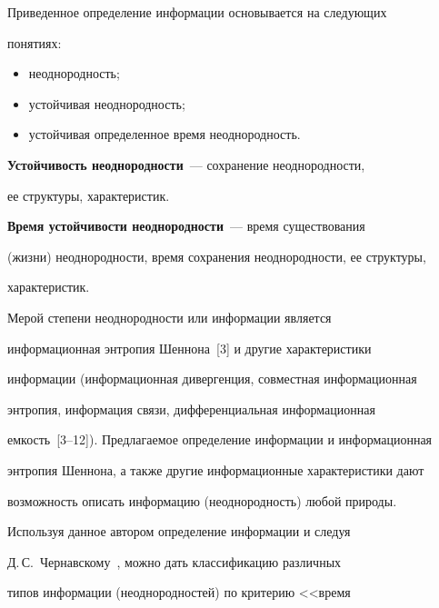 %   


   Приведенное определение информации основывается на следующих 


понятиях:


   \begin{itemize}


\item неоднородность;


\item устойчивая неоднородность;


\item устойчивая определенное время неоднородность.


\end{itemize}





   \textbf{Устойчивость неоднородности}~--- сохранение неоднородности, 


ее структуры, характеристик.


   


   \textbf{Время устойчивости неоднородности}~--- время существования 


(жизни) неоднородности, время сохранения неоднородности, ее структуры, 


характеристик.


   


   Мерой степени неоднородности или информации является 


информационная энтропия Шеннона~[3] и другие характеристики 


информации (информационная дивергенция, совместная информационная 


энтропия, информация связи, дифференциальная информационная 


емкость~[3--12]). Предлагаемое определение информации и информационная 


энтропия Шеннона, а также другие информационные характеристики дают 


возможность описать информацию (неоднородность) любой природы.


   


   Используя данное автором определение информации и следуя 


Д.\,С.~Чернавскому~\cite{13-2-15}, можно дать классификацию различных 


типов информации (неоднородностей) по критерию <<время 


